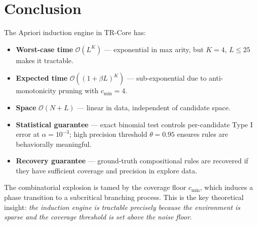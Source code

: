 \documentclass[11pt]{article}
\newcommand{\Oh}{\mathcal{O}}
\begin{document}
\section{Conclusion}

The Apriori induction engine in TR-Core has:
\begin{itemize}
    \item \textbf{Worst-case time} $\Oh(L^K)$ — exponential in max arity, but $K=4$, $L \leq 25$ makes it tractable.
    \item \textbf{Expected time} $\Oh((1+\beta L)^K)$ — sub-exponential due to anti-monotonicity pruning with $c_{\min}=4$.
    \item \textbf{Space} $\Oh(N + L)$ — linear in data, independent of candidate space.
    \item \textbf{Statistical guarantee} — exact binomial test controls per-candidate Type I error at $\alpha=10^{-3}$; high precision threshold $\theta=0.95$ ensures rules are behaviorally meaningful.
    \item \textbf{Recovery guarantee} — ground-truth compositional rules are recovered if they have sufficient coverage and precision in explore data.
\end{itemize}

The combinatorial explosion is tamed by the coverage floor $c_{\min}$, which induces a phase transition to a subcritical branching process. This is the key theoretical insight: \emph{the induction engine is tractable precisely because the environment is sparse and the coverage threshold is set above the noise floor}.
\end{document}
